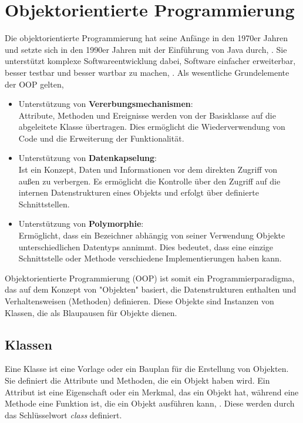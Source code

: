 \chapter{Objektorientierte Programmierung}\label{Objektorientierte Programmierung}

Die objektorientierte Programmierung hat seine Anfänge in den 1970er Jahren und setzte sich in den 1990er Jahren mit der Einführung von Java durch, \cite{Steyer:2018}. Sie unterstützt komplexe Softwareentwicklung dabei, Software einfacher erweiterbar, besser testbar und besser wartbar zu machen, \cite{Lahres:2021}. Als wesentliche Grundelemente der OOP gelten, \cite{Lahres:2021}


\begin{itemize}
	\itemsep0pt
	\item Unterstützung von \textbf{Vererbungsmechanismen}: \\
	Attribute, Methoden und Ereignisse werden von der Basisklasse auf die abgeleitete Klasse übertragen. Dies ermöglicht die Wiederverwendung von Code und die Erweiterung der Funktionalität.
	\item Unterstützung von \textbf{Datenkapselung}: \\
	Ist ein Konzept, Daten und Informationen vor dem direkten Zugriff von außen zu verbergen. Es ermöglicht die Kontrolle über den Zugriff auf die internen Datenstrukturen eines Objekts und erfolgt über definierte Schnittstellen.
	\item Unterstützung von \textbf{Polymorphie}: \\
	Ermöglicht, dass ein Bezeichner abhängig von seiner Verwendung Objekte unterschiedlichen Datentyps annimmt. Dies bedeutet, dass eine einzige Schnittstelle oder Methode verschiedene Implementierungen haben kann.
\end{itemize}

Objektorientierte Programmierung (OOP) ist somit ein Programmierparadigma, das auf dem Konzept von "Objekten" basiert, die Datenstrukturen enthalten und Verhaltensweisen (Methoden) definieren. Diese Objekte sind Instanzen von Klassen, die als Blaupausen für Objekte dienen. 

\section{Klassen}
Eine Klasse ist eine Vorlage oder ein Bauplan für die Erstellung von Objekten. Sie definiert die Attribute und Methoden, die ein Objekt haben wird. Ein Attribut ist eine Eigenschaft oder ein Merkmal, das ein Objekt hat, während eine Methode eine Funktion ist, die ein Objekt ausführen kann, \cite{Steyer:2018}. Diese werden durch das Schlüsselwort \textit{class} definiert. 

